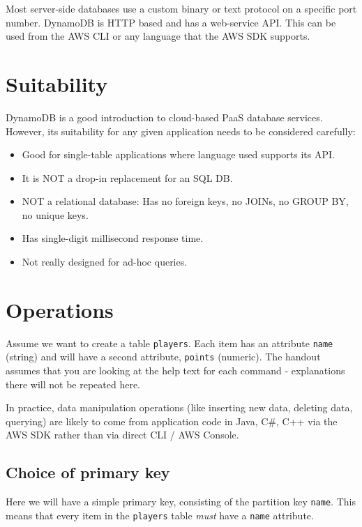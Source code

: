 \documentclass[slides]{pgnotes}
\begin{document}
Most server-side databases use a custom binary or text protocol on a
specific port number. DynamoDB is HTTP based and has a web-service API.
This can be used from the AWS CLI or any language that the AWS SDK
supports.

\section{Suitability}\label{sec:suitability}

DynamoDB is a good introduction to cloud-based PaaS database services.
However, its suitability for any given application needs to be
considered carefully:

\begin{itemize}
\item
  Good for single-table applications where language used supports its
  API.
\item
  It is NOT a drop-in replacement for an SQL DB.
\item
  NOT a relational database: Has no foreign keys, no JOINs, no GROUP BY,
  no unique keys.
\item
  Has single-digit millisecond response time.
\item
  Not really designed for ad-hoc queries.
\end{itemize}

\section{Operations}\label{sec:operations}

Assume we want to create a table \texttt{players}. Each item has an
attribute \texttt{name} (string) and will have a second attribute,
\texttt{points} (numeric). The handout assumes that you are looking at
the help text for each command - explanations there will not be repeated
here.

In practice, data manipulation operations (like inserting new data,
deleting data, querying) are likely to come from application code in
Java, C\#, C++ via the AWS SDK rather than via direct CLI / AWS Console.

\subsection{Choice of primary key}\label{sec:choice-of-primary-key}

Here we will have a simple primary key, consisting of the partition key
\texttt{name}. This means that every item in the \texttt{players} table
\emph{must} have a \texttt{name} attribute.
\end{document}
